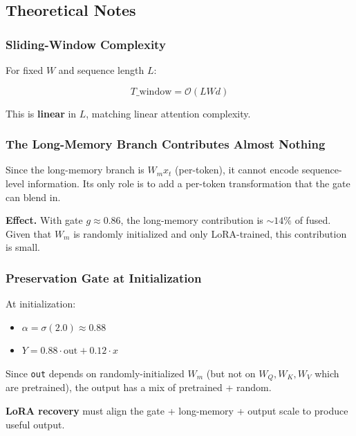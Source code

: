 \subsection{Theoretical Notes}

\subsubsection{Sliding-Window Complexity}

For fixed $W$ and sequence length $L$:

\[
T\_\text{window} = \mathcal{O}(L W d)
\tag{4.12}
\]

This is \textbf{linear} in $L$, matching linear attention complexity.

\subsubsection{The Long-Memory Branch Contributes Almost Nothing}

Since the long-memory branch is $W_m x_t$ (per-token), it cannot encode 
sequence-level information. Its only role is to add a per-token 
transformation that the gate can blend in.

\textbf{Effect.} With gate $g \approx 0.86$, the long-memory contribution is 
$\sim 14\%$ of fused. Given that $W_m$ is randomly initialized and only 
LoRA-trained, this contribution is small.

\subsubsection{Preservation Gate at Initialization}

At initialization:
\begin{itemize}
\item $\alpha = \sigma(2.0) \approx 0.88$
\item $Y = 0.88 \cdot \text{out} + 0.12 \cdot x$

\end{itemize}
Since \texttt{out} depends on randomly-initialized $W_m$ (but not on $W_Q, W_K, W_V$ 
which are pretrained), the output has a mix of pretrained + random.

\textbf{LoRA recovery} must align the gate + long-memory + output scale to 
produce useful output.

